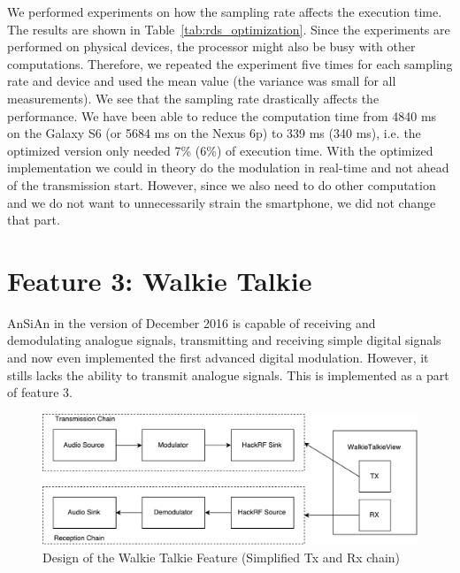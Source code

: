 We performed experiments on how the sampling rate affects the execution time. The results are shown in Table~\ref{tab:rds_optimization}. Since the experiments are performed on physical devices, the processor might also be busy with other computations. Therefore, we repeated the experiment five times for each sampling rate and device and used the mean value (the variance was small for all measurements).  We see that the sampling rate drastically affects the performance. We have been able to reduce the computation time from 4840 ms on the Galaxy S6 (or 5684 ms on the Nexus 6p) to 339 ms (340 ms), i.e. the optimized version only needed 7\% (6\%) of execution time.
With the optimized implementation we could in theory do the modulation in real-time and not ahead of the transmission start. However, since we also need to do other computation and we do not want to unnecessarily strain the smartphone, we did not change that part. 

\section{Feature 3: Walkie Talkie} 

AnSiAn in the version of December 2016 is capable of receiving and demodulating analogue signals, transmitting and receiving simple digital signals and now even implemented the first advanced digital modulation. However, it stills lacks the ability to transmit analogue signals. This is implemented as a part of feature 3. 
\begin{figure}[!htbp]
	\centering
	\includegraphics[width=1.0\linewidth]{gfx/feature3_concept.pdf}
	\caption{Design of the Walkie Talkie Feature (Simplified Tx and Rx chain)}
	\label{fig:impl:f3concept}
\end{figure}

